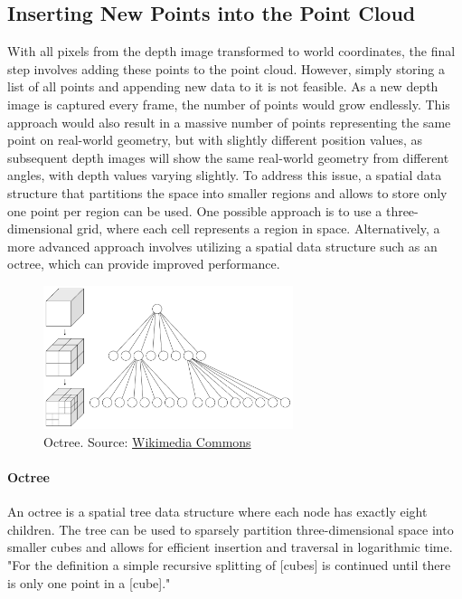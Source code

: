 \subsection{Inserting New Points into the Point Cloud}\label{subsec:inserting-new-points-into-the-point-cloud}

With all pixels from the depth image transformed to world coordinates, the final step involves adding these points to the point cloud.
However, simply storing a list of all points and appending new data to it is not feasible.
As a new depth image is captured every frame, the number of points would grow endlessly.
This approach would also result in a massive number of points representing the same point on real-world geometry,
but with slightly different position values,
as subsequent depth images will show the same real-world geometry from different angles, with depth values varying slightly.
To address this issue, a spatial data structure that partitions the space into smaller regions and
allows to store only one point per region can be used.
One possible approach is to use a three-dimensional grid, where each cell represents a region in space.
Alternatively, a more advanced approach involves utilizing a spatial data structure such as an octree,
which can provide improved performance.

\begin{figure}[h]
    \centering
    \includegraphics[width=0.65\textwidth]{images/octree}
    \caption{Octree. Source: \href{https://commons.wikimedia.org/wiki/File:Octree2.svg}{Wikimedia Commons}}
    \label{fig:octrree}
\end{figure}

\paragraph{Octree}
An octree is a spatial tree data structure where each node has exactly eight children.
The tree can be used to sparsely partition three-dimensional space into smaller cubes and allows for efficient
insertion and traversal in logarithmic time.
"For the definition a simple recursive splitting of [cubes] is continued until there is only one point in a [cube]."
\parencite{gabriel_zachmann_geometric_2002}


